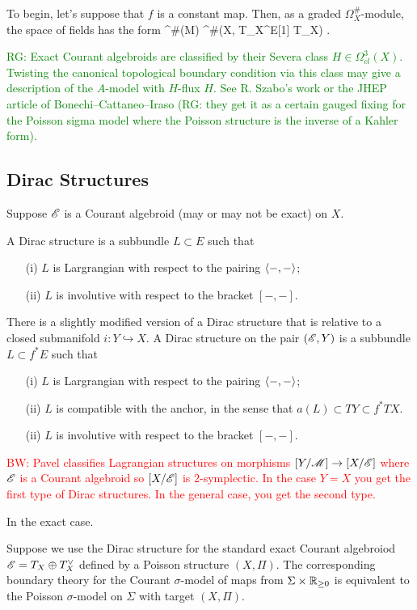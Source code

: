 \documentclass{amsart}
\def\ryan{\textcolor{green}{RG: }\textcolor{green}}
\def\brian{\textcolor{red}{BW: }\textcolor{red}}
\begin{document}
To begin, let's suppose that $f$ is a constant map. 
Then, as a graded $\Omega^\#_X$-module, the space of fields has the form
\ben
\Omega^\#(M) \tensor \Omega^\#(X, T_X^\vee [2] \oplus E[1] \oplus T_X) .
\een 

\ryan{Exact Courant algebroids are classified by their Severa class $H \in \Omega^3_{cl} (X)$.  Twisting the canonical topological boundary condition via this class may give a description of the $A$-model with $H$-flux $H$. See R. Szabo's work or the JHEP article of Bonechi--Cattaneo--Iraso (\ryan{they get it as a certain gauged fixing for the Poisson sigma model where the Poisson structure is the inverse of a Kahler form}).}

\subsection{Dirac Structures}

Suppose $\mathscr E$ is a Courant algebroid (may or may not be exact) on $X$.

A Dirac structure is a subbundle $L \subset E$ such that 
\begin{itemize}
\item[(i)] $L$ is Largrangian with respect to the pairing $\left\langle-,-\right\rangle$;
\item[(ii)] $L$ is involutive with respect to the bracket $[-,-]$.
\end{itemize}

There is a slightly modified version of a Dirac structure that is relative to a closed submanifold $i : Y \hookrightarrow X$. 
A Dirac structure on the pair $(\mathscr E,Y)$ is a subbundle $L \subset f^*E$ such that 
\begin{itemize}
\item[(i)] $L$ is Largrangian with respect to the pairing $\left\langle-,-\right\rangle$;
\item[(ii)] $L$ is compatible with the anchor, in the sense that $a(L) \subset TY \subset f^* TX$. 
\item[(ii)] $L$ is involutive with respect to the bracket $[-,-]$.
\end{itemize}

\brian{Pavel classifies Lagrangian structures on morphisms $[Y / \mathscr M] \to [X / \mathscr E]$ where $\mathscr E$ is a Courant algebroid so $[X/ \mathscr E]$ is $2$-symplectic. 
In the case $Y = X$ you get the first type of Dirac structures. 
In the general case, you get the second type. 
}

In the exact case.

\begin{prop} 
Suppose we use the Dirac structure for the standard exact Courant algebroiod $\mathscr E = T_X \oplus T_X^\vee$ defined by a Poisson structure $(X, \Pi)$. 
The corresponding boundary theory for the Courant $\sigma$-model of maps from $\Sigma \times \mathbb R_{\geq 0}$ is equivalent to the Poisson $\sigma$-model on $\Sigma$ with target $(X, \Pi)$. 
\end{prop}
\end{document}
